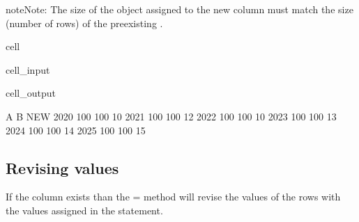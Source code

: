 \documentclass[letterpaper,10pt,english]{jupyterBook}
\begin{document}
\begin{sphinxadmonition}{note}{Note:}
\sphinxAtStartPar
The size of the object assigned to the new column must match the size (number of rows) of the pre\sphinxhyphen{}existing .
\end{sphinxadmonition}

\begin{sphinxuseclass}{cell}\begin{sphinxVerbatimInput}

\begin{sphinxuseclass}{cell_input}
\begin{sphinxVerbatim}[commandchars=\\\{\}]
\PYG{p}{[}\PYG{p}{]}\PYG{p}{[}\PYG{p}{]}  
\end{sphinxVerbatim}

\end{sphinxuseclass}\end{sphinxVerbatimInput}
\begin{sphinxVerbatimOutput}

\begin{sphinxuseclass}{cell_output}
\begin{sphinxVerbatim}[commandchars=\\\{\}]
        A    B  NEW
2020  100  100   10
2021  100  100   12
2022  100  100   10
2023  100  100   13
2024  100  100   14
2025  100  100   15
\end{sphinxVerbatim}

\end{sphinxuseclass}\end{sphinxVerbatimOutput}

\end{sphinxuseclass}

\subsection{Revising values}
\label{\detokenize{content/04_PythonEssentials/PythonPandasDataframes:revising-values}}
\sphinxAtStartPar
If the column exists than the = method will revise the values of the rows with the values assigned in the statement.
\end{document}
